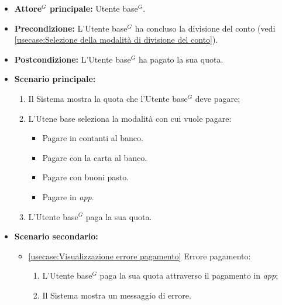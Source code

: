 \label{usecase:Pagamento del conto}
\begin{itemize}
	\item \textbf{\gls{Attore}$^G$ principale:} \gls{Utente base}$^G$.

	\item \textbf{Precondizione:} L'\gls{Utente base}$^G$ ha concluso la divisione del conto (vedi \autoref{usecase:Selezione della modalità di divisione del conto}).

	\item \textbf{Postcondizione:} L'\gls{Utente base}$^G$ ha pagato la sua quota.

	\item \textbf{Scenario principale:}
            \begin{enumerate}
                \item Il Sistema mostra la quota che l'\gls{Utente base}$^G$ deve pagare;
                \item L'Utene base seleziona la modalità con cui vuole pagare:
                \begin{itemize}
                    \item Pagare in contanti al banco.
                    \item Pagare con la carta al banco.
                    \item Pagare con buoni pasto.
                    \item Pagare in \textit{app}.
                \end{itemize}
				\item L'\gls{Utente base}$^G$ paga la sua quota.
	      \end{enumerate}

    \item \textbf{Scenario secondario:}
		  \begin{itemize}
			  \item \autoref{usecase:Visualizzazione errore pagamento} Errore pagamento:
				\begin{enumerate}
					\item L'\gls{Utente base}$^G$ paga la sua quota attraverso il pagamento in \textit{app};
					\item  Il Sistema mostra un messaggio di errore.
				\end{enumerate}
		  \end{itemize}
\end{itemize}